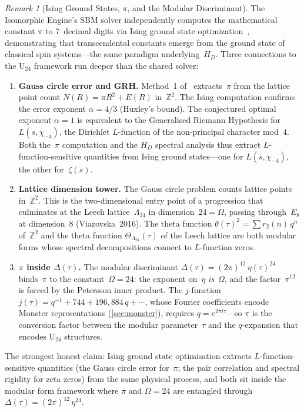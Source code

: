 \documentclass[11pt,a4paper]{article}
\theoremstyle{plain}
\theoremstyle{remark}
\newtheorem{remark}[theorem]{Remark}
\renewcommand{\Omega}{\varOmega}
\newcommand{\Z}{\mathbb{Z}}
\begin{document}
\begin{remark}[Ising Ground States, $\pi$, and the Modular Discriminant]
\label{rem:pi-ising}
The Isomorphic Engine's SBM solver independently computes the
mathematical constant $\pi$ to 7~decimal digits via Ising ground state
optimization~\cite{daugherty-pi2026}, demonstrating that transcendental
constants emerge from the ground state of classical spin systems---the
same paradigm underlying~$H_D$.  Three connections to the
$\mathrm{U}_{24}$ framework run deeper than the shared solver:

\begin{enumerate}[nosep,label=(\roman*)]
  \item \textbf{Gauss circle error and GRH.}\enspace
        Method~1 of~\cite{daugherty-pi2026} extracts~$\pi$ from the
        lattice point count $N(R)=\pi R^2+E(R)$ in~$\Z^2$.  The
        Ising computation confirms the error exponent $\alpha=4/3$
        (Huxley's bound).  The conjectured optimal exponent
        $\alpha=1$ is equivalent to the Generalised Riemann Hypothesis
        for $L(s,\chi_{-4})$, the Dirichlet $L$-function of the
        non-principal character mod~$4$.
        Both the~$\pi$ computation and the $H_D$ spectral analysis
        thus extract $L$-function-sensitive quantities from Ising
        ground states---one for $L(s,\chi_{-4})$, the other for~$\zeta(s)$.
  \item \textbf{Lattice dimension tower.}\enspace
        The Gauss circle problem counts lattice points in~$\Z^2$.
        This is the two-dimensional entry point of a progression that
        culminates at the Leech lattice~$\Lambda_{24}$ in
        dimension~$24=\Omega$, passing through~$E_8$ at dimension~8
        (Viazovska~2016).  The theta function $\theta(\tau)^2
        =\sum r_2(n)\,q^n$ of~$\Z^2$ and the theta function
        $\Theta_{\Lambda_{24}}(\tau)$ of the Leech lattice are both
        modular forms whose spectral decompositions connect to
        $L$-function zeros.
  \item \textbf{$\pi$ inside $\Delta(\tau)$.}\enspace
        The modular discriminant
        $\Delta(\tau)=(2\pi)^{12}\,\eta(\tau)^{24}$ binds~$\pi$ to the
        constant~$\Omega=24$: the exponent on~$\eta$ \emph{is}~$\Omega$,
        and the factor~$\pi^{12}$ is forced by the Petersson inner product.
        The $j$-function $j(\tau)=q^{-1}+744+196{,}884\,q+\cdots$,
        whose Fourier coefficients encode Monster representations
        (\cref{sec:monster}), requires $q=e^{2\pi i\tau}$---so $\pi$ is
        the conversion factor between the modular parameter~$\tau$ and
        the $q$-expansion that encodes $\mathrm{U}_{24}$ structures.
\end{enumerate}

\noindent
The strongest honest claim: Ising ground state optimisation extracts
$L$-function-sensitive quantities (the Gauss circle error for~$\pi$;
the pair correlation and spectral rigidity for zeta zeros) from the
same physical process, and both sit inside the modular form framework
where $\pi$ and $\Omega=24$ are entangled through
$\Delta(\tau)=(2\pi)^{12}\,\eta^{24}$.
\end{remark}
\end{document}
